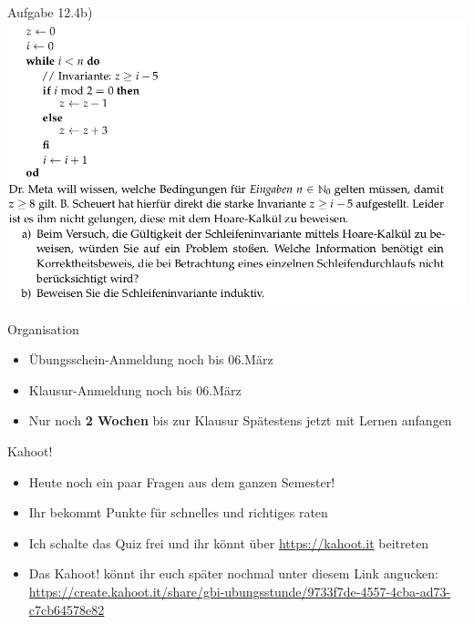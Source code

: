 \begin{frame}{Aufgabe 12.4b)}
	\includegraphics[width=\textwidth,height=\textheight,keepaspectratio]{A12.4_UB2122.png}
\end{frame}

\begin{frame}{Organisation}
	\begin{itemize}
		\item Übungsschein-Anmeldung noch bis 06.März
		\item Klausur-Anmeldung noch bis 06.März
		\item Nur noch \textbf{2 Wochen} bis zur Klausur \impl Spätestens jetzt mit Lernen anfangen
	\end{itemize}
\end{frame}

\framePrevEpisode

\begin{frame}{Kahoot!}
	\begin{itemize}
		\item Heute noch ein paar Fragen aus dem ganzen Semester!
		\item Ihr bekommt Punkte für schnelles und richtiges raten
		\pause
		\item Ich schalte das Quiz frei und ihr könnt über \url{https://kahoot.it} beitreten
		\item Das Kahoot! könnt ihr euch später nochmal unter diesem Link angucken: \\
			\url{https://create.kahoot.it/share/gbi-ubungsstunde/9733f7de-4557-4cba-ad73-c7cb64578e82}
	\end{itemize}
\end{frame}




